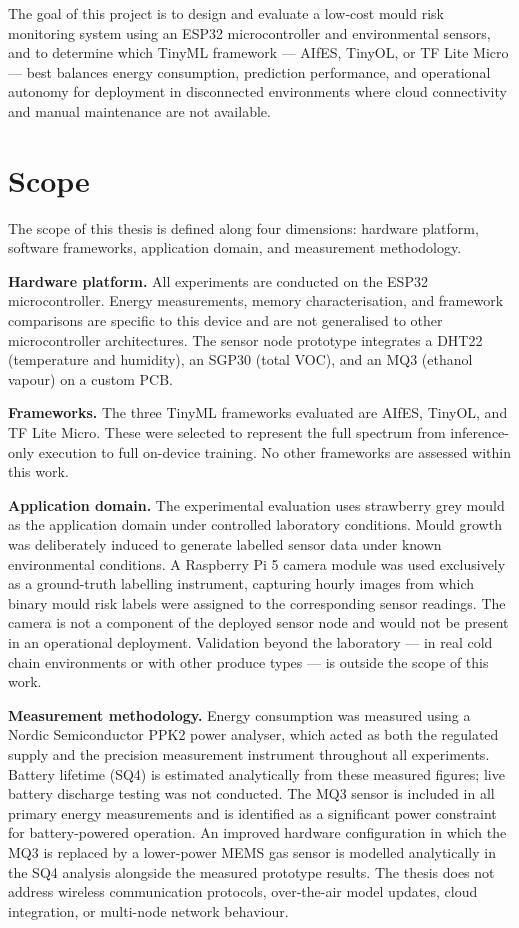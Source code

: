 The goal of this project is to design and evaluate a low-cost mould risk monitoring system using an ESP32 microcontroller and environmental sensors, and to determine which TinyML framework --- AIfES, TinyOL, or TF Lite Micro --- best balances energy consumption, prediction performance, and operational autonomy for deployment in disconnected environments where cloud connectivity and manual maintenance are not available.

\section{Scope}

The scope of this thesis is defined along four dimensions: hardware platform, software frameworks, application domain, and measurement methodology.

\textbf{Hardware platform.} All experiments are conducted on the ESP32 microcontroller. Energy measurements, memory characterisation, and framework comparisons are specific to this device and are not generalised to other microcontroller architectures. The sensor node prototype integrates a DHT22 (temperature and humidity), an SGP30 (total VOC), and an MQ3 (ethanol vapour) on a custom PCB.

\textbf{Frameworks.} The three TinyML frameworks evaluated are AIfES, TinyOL, and TF Lite Micro. These were selected to represent the full spectrum from inference-only execution to full on-device training. No other frameworks are assessed within this work.

\textbf{Application domain.} The experimental evaluation uses strawberry grey mould as the application domain under controlled laboratory conditions. Mould growth was deliberately induced to generate labelled sensor data under known environmental conditions. A Raspberry Pi 5 camera module was used exclusively as a ground-truth labelling instrument, capturing hourly images from which binary mould risk labels were assigned to the corresponding sensor readings. The camera is not a component of the deployed sensor node and would not be present in an operational deployment. Validation beyond the laboratory --- in real cold chain environments or with other produce types --- is outside the scope of this work.

\textbf{Measurement methodology.} Energy consumption was measured using a Nordic Semiconductor PPK2 power analyser, which acted as both the regulated supply and the precision measurement instrument throughout all experiments. Battery lifetime (SQ4) is estimated analytically from these measured figures; live battery discharge testing was not conducted. The MQ3 sensor is included in all primary energy measurements and is identified as a significant power constraint for battery-powered operation. An improved hardware configuration in which the MQ3 is replaced by a lower-power MEMS gas sensor is modelled analytically in the SQ4 analysis alongside the measured prototype results. The thesis does not address wireless communication protocols, over-the-air model updates, cloud integration, or multi-node network behaviour.

